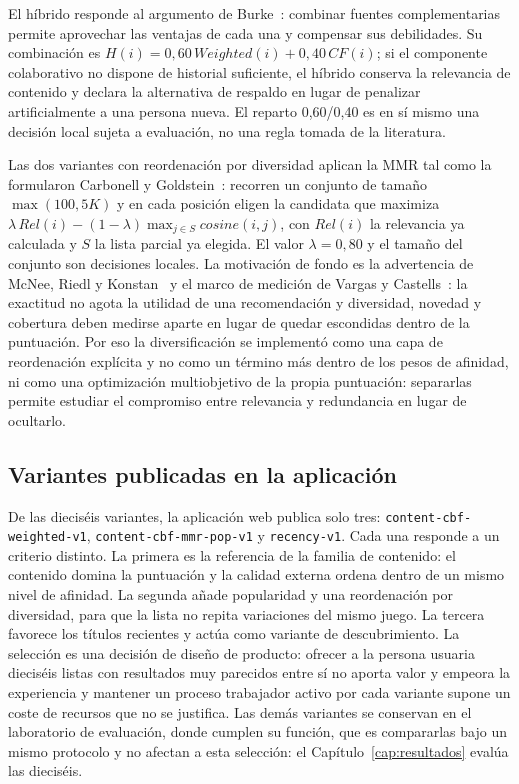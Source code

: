 El híbrido responde al argumento de Burke~\cite{burke2002hybrid}: combinar fuentes
complementarias permite aprovechar las ventajas de cada una y compensar sus debilidades. Su
combinación es \(H(i) = 0{,}60\,\mathit{Weighted}(i) + 0{,}40\,\mathit{CF}(i)\); si el
componente colaborativo no dispone de historial suficiente, el híbrido conserva la relevancia
de contenido y declara la alternativa de respaldo en lugar de penalizar artificialmente a una persona
nueva. El reparto 0,60/0,40 es en sí mismo una decisión local sujeta a evaluación, no una regla
tomada de la literatura.

Las dos variantes con reordenación por diversidad aplican la MMR
tal como la formularon Carbonell y Goldstein~\cite{carbonell1998mmr}: recorren un conjunto de
tamaño \(\max(100, 5K)\) y en cada posición eligen la candidata que maximiza
\(\lambda\,Rel(i) - (1-\lambda)\max_{j \in S} cosine(i,j)\), con \(Rel(i)\) la relevancia ya
calculada y \(S\) la lista parcial ya elegida. El valor \(\lambda = 0{,}80\) y el tamaño del
conjunto son decisiones locales. La motivación de fondo es la advertencia de McNee, Riedl y
Konstan~\cite{mcnee2006accurate} y el marco de medición de Vargas y
Castells~\cite{vargas2011rank}: la exactitud no agota la utilidad de una recomendación y
diversidad, novedad y cobertura deben medirse aparte en lugar de quedar escondidas dentro de la
puntuación. Por eso la diversificación se implementó como una capa de reordenación explícita y
no como un término más dentro de los pesos de afinidad, ni como una optimización multiobjetivo
de la propia puntuación: separarlas permite estudiar el compromiso entre relevancia y
redundancia en lugar de ocultarlo.

\subsection{Variantes publicadas en la aplicación}\label{sec:alg-publicadas}

De las dieciséis variantes, la aplicación web publica solo tres: \texttt{content-cbf-weighted-v1},
\texttt{content-cbf-mmr-pop-v1} y \texttt{recency-v1}. Cada una responde a un criterio distinto.
La primera es la referencia de la familia de contenido: el contenido domina la puntuación y la
calidad externa ordena dentro de un mismo nivel de afinidad. La segunda añade popularidad y una
reordenación por diversidad, para que la lista no repita variaciones del mismo juego. La
tercera favorece los títulos recientes y actúa como variante de descubrimiento. La selección es
una decisión de diseño de producto: ofrecer a la persona usuaria dieciséis listas con resultados
muy parecidos entre sí no aporta valor y empeora la experiencia y mantener un proceso trabajador
activo por cada variante supone un coste de recursos que no se justifica. Las demás variantes
se conservan en el laboratorio de evaluación, donde cumplen su función, que es compararlas bajo
un mismo protocolo y no afectan a esta selección: el Capítulo~\ref{cap:resultados} evalúa las
dieciséis.

